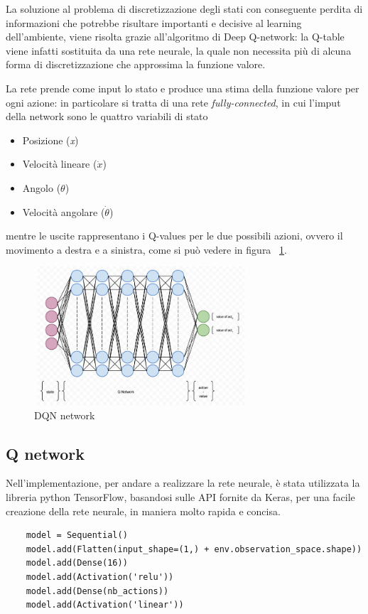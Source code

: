 
La soluzione al problema di discretizzazione degli stati con conseguente perdita di informazioni che potrebbe risultare importanti e decisive al learning dell'ambiente, viene risolta grazie all'algoritmo di Deep Q-network: la Q-table viene infatti sostituita da una rete neurale, la quale non necessita più di alcuna forma di discretizzazione che approssima la funzione valore.

La rete prende come input lo stato e produce una stima della funzione valore per ogni azione: in particolare si tratta di una rete \textit{fully-connected}, in cui l'imput della network sono le quattro variabili di stato
\begin{itemize}
	\item Posizione (\textit{x})
	\item Velocità lineare ($\dot{x}$)
	\item Angolo ($\theta$)
	\item Velocità angolare ($\dot{\theta}$)
\end{itemize}
mentre le uscite rappresentano i Q-values per le due possibili azioni, ovvero il movimento a destra e a sinistra, come si può vedere in figura ~\ref{fig:DQN_network}.

\begin{figure}[!h]
	\centering
	\includegraphics[width=0.7\textwidth]{Immagini/DQN_network.JPG}
	\caption{DQN network}
	\label{fig:DQN_network}
\end{figure}

\subsection{Q network}
Nell'implementazione, per andare a realizzare la rete neurale, è stata utilizzata la libreria python TensorFlow, basandosi sulle API fornite da Keras, per una facile creazione della rete neurale, in maniera molto rapida e concisa.

\begin{lstlisting}
	model = Sequential()
	model.add(Flatten(input_shape=(1,) + env.observation_space.shape))
	model.add(Dense(16))
	model.add(Activation('relu'))
	model.add(Dense(nb_actions))
	model.add(Activation('linear'))
\end{lstlisting}

